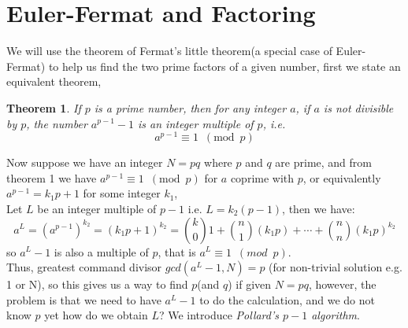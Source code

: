 \documentclass[10pt]{article}
\newtheorem{theorem}{Theorem}
\begin{document}
\section{Euler-Fermat and Factoring}  
We will use the theorem of Fermat's little theorem(a special case of Euler-Fermat) to help us find the two prime factors of a given number, first we state an equivalent theorem\cite{fermat}, 
\begin{theorem}
If $p$ is a prime number, then for any integer $a$, if $a$ is not divisible by $p$, the number $a^{p-1}-1$ is an integer multiple of $p$, i.e.  
\[a^{p-1} \equiv 1 \enspace (\text{mod}\enspace p)\]
\end{theorem}
\noindent Now suppose we have an integer $N = pq$ where $p$ and $q$ are prime, and from theorem 1 we have $a^{p-1} \equiv 1 \enspace (\text{mod}\enspace p)$ for $a$ coprime with $p$, or equivalently $a^{p-1}=k_1p+1$ for some integer $k_1$,\\
Let $L$ be an integer multiple of $p-1$ i.e. $L=k_2(p-1)$, then we have: 
\begin{equation*}
a^L=(a^{p-1})^{k_2}=(k_1p+1)^{k_2}=\binom{k}{0}1 + \binom{n}{1}(k_1p) + \cdots +
\binom{n}{n}(k_1p)^{k_2}
\end{equation*}
so $a^L-1$ is also a multiple of $p$, that is $a^L \equiv 1 \enspace(mod\enspace p)$.\\
Thus, greatest command divisor $gcd(a^L-1, N)=p$ (for non-trivial solution e.g. 1 or N), so this gives us a way to find $p$(and $q$) if given $N=pq$, however, the problem is that we need to have $a^L-1$ to do the calculation, and we do not know $p$ yet how do we obtain $L$? We introduce \textit{Pollard's $p-1$ algorithm}.
\end{document}
